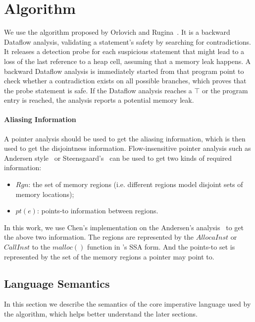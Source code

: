 \section{Algorithm}
\label{s:algorithm}

We use the algorithm proposed by Orlovich and Rugina~\cite{rugina}. It is a 
backward Dataflow analysis, validating a statement's safety by searching for 
contradictions. It releases a detection probe for each suspicious statement 
that might lead to a loss of the last reference to a heap cell, assuming that 
a memory leak happens. A backward Dataflow analysis is immediately started from
that program point to check whether a contradiction exists on all possible 
branches, which proves that the probe statement is safe. If the Dataflow analysis 
reaches a $\top$ or the program entry is reached, the analysis reports a 
potential memory leak.

\paragraph{Aliasing Information}

A pointer analysis should be used to get the aliasing information, 
which is then used to get the disjointness information. Flow-insensitive 
pointer analysis such as Andersen style~\cite{andersen} or 
Steensgaard's~\cite{steensgaard} can be used to get two kinds of required 
information:

\begin{itemize}
  \item $Rgn$: the set of memory regions 
    (i.e. different regions model disjoint sets of memory locations);
  \item $pt(e)$: points-to information between regions.
\end{itemize}

In this work, we use Chen's implementation on the Andersen's 
analysis~\cite{chen} to get the above two information.
The regions are represented by the $AllocaInst$ or $CallInst$ to the $malloc()$ 
function in \llvm's SSA form. And the points-to set is represented by the 
set of the memory regions a pointer may point to.


\subsection{Language Semantics}
\label{ss:semantics}

In this section we describe the semantics of the core imperative language 
used by the algorithm, which helps better understand the later sections.

